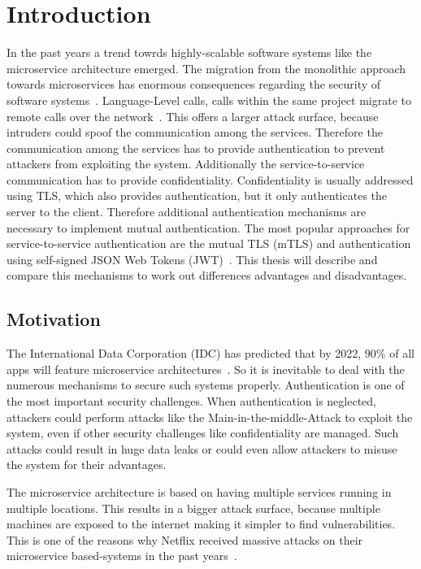\chapter{Introduction}
\label{cha:Introduction}
In the past years a trend towrds highly-scalable software systems like the microservice architecture emerged.
The migration from the monolithic approach towards microservices has enormous consequences regarding the security of software systems~\cite{shmeleva2020microservices}. 
Language-Level calls, calls within the same project migrate to remote calls over the network~\cite{chandramouli2019microservices}. 
This offers a larger attack surface, because intruders could spoof the communication among the services.
Therefore the communication among the services has to provide authentication to prevent attackers from exploiting the system.
Additionally the service-to-service communication has to provide confidentiality.
Confidentiality is usually addressed using TLS, which also provides authentication, but it only authenticates the server to the client.
Therefore additional authentication mechanisms are necessary to implement mutual authentication.
The most popular approaches for service-to-service authentication are the mutual TLS (mTLS) and authentication using self-signed JSON Web Tokens (JWT)~\cite{dias2020microservices}.
This thesis will describe and compare this mechanisms to work out differences advantages and disadvantages.

\section{Motivation}
The International Data Corporation (IDC) has predicted that by 2022, 90\% of all apps will feature microservice architectures~\cite{idcprediction2019}. 
So it is inevitable to deal with the numerous mechanisms to secure such systems properly. 
Authentication is one of the most important security challenges.
When authentication is neglected, attackers could perform attacks like the Main-in-the-middle-Attack to exploit the system, even if other security challenges like confidentiality are managed.
Such attacks could result in huge data leaks or could even allow attackers to misuse the system for their advantages.

The microservice architecture is based on having multiple services running in multiple locations.
This results in a bigger attack surface, because multiple machines are exposed to the internet making it simpler to find vulnerabilities.
This is one of the reasons why Netflix received massive attacks on their microservice based-systems in the past years~\cite{pereira2019security}.

